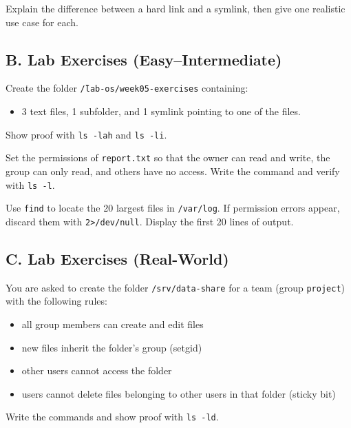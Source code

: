 \begin{exercisebox}[4.B]
Explain the difference between a hard link and a symlink, then give one
realistic use case for each.
\end{exercisebox}

\subsection*{B. Lab Exercises (Easy--Intermediate)}
\begin{exercisebox}[4.C]
Create the folder \texttt{\~/lab-os/week05-exercises} containing:
\begin{itemize}
    \item 3 text files, 1 subfolder, and 1 symlink pointing to one of the files.
\end{itemize}
Show proof with \texttt{ls -lah} and \texttt{ls -li}.
\end{exercisebox}

\begin{exercisebox}[4.D]
Set the permissions of \texttt{report.txt} so that the owner can read and
write, the group can only read, and others have no access. Write the command
and verify with \texttt{ls -l}.
\end{exercisebox}

\begin{exercisebox}[4.E]
Use \texttt{find} to locate the 20 largest files in \texttt{/var/log}. If
permission errors appear, discard them with \texttt{2>/dev/null}. Display the
first 20 lines of output.
\end{exercisebox}

\subsection*{C. Lab Exercises (Real-World)}
\begin{exercisebox}
You are asked to create the folder \texttt{/srv/data-share} for a team (group
\texttt{project}) with the following rules:
\begin{itemize}
\item all group members can create and edit files
\item new files inherit the folder's group (setgid)
\item other users cannot access the folder
\item users cannot delete files belonging to other users in that folder (sticky bit)
\end{itemize}
Write the commands and show proof with \texttt{ls -ld}.
\end{exercisebox}


